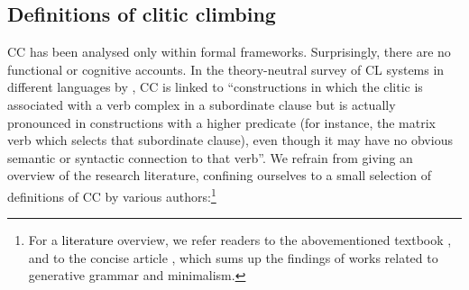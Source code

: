 \subsection{Definitions of clitic climbing}

CC has been analysed only within formal frameworks. Surprisingly, there are no functional or cognitive accounts. In the theory-neutral survey of CL systems in different languages by \citet[162]{SpencerLuis12}, CC is linked to “constructions in which the clitic is associated with a verb complex in a subordinate clause but is actually pronounced in constructions with a higher predicate (for instance, the matrix verb which selects that subordinate clause), even though it may have no obvious semantic or syntactic connection to that verb”. We refrain from giving an overview of the research literature, confining ourselves to a small selection of definitions of CC by various authors:\footnote{For a \textcolor{black}{literature} overview, we refer readers to the abovementioned textbook \citet{SpencerLuis12}, and to the concise article \citet{Dotlacil16}, which sums up the findings of works related to generative grammar and minimalism.}

